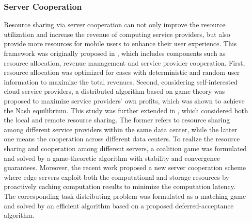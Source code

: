 \documentclass[journal]{IEEEtran}
\begin{document}
\subsubsection{\textbf{Server Cooperation}} Resource sharing via server cooperation can not only improve the resource utilization and increase the revenue of computing service providers, but also provide more resources for mobile users to enhance their user experience. This framework was originally proposed in  \cite{kaewpuang2013framework}, which includes components such as resource allocation, revenue management and service provider cooperation. First, resource allocation was optimized for cases with deterministic and random user information to maximize the total revenues. Second, considering self-interested cloud service providers, a distributed algorithm based on game theory was proposed to maximize service providers' own profits, which was shown to achieve the Nash equilibrium. This study was further extended in \cite{yu2015decentralized}, which considered both the local and remote resource sharing. The former refers to resource sharing among different service providers within the same data center, while the latter one means the cooperation across different data centers. To realize the resource sharing and cooperation among different servers, a coalition game was formulated and solved by a game-theoretic algorithm with stability and convergence guarantees. Moreover, the recent work \cite{elbamby2017proactive} proposed a new server cooperation scheme where edge servers exploit both the computational and storage resources by proactively caching computation results to minimize the computation latency. The corresponding task distributing problem was formulated as a matching game  and solved by an efficient algorithm based on a proposed deferred-acceptance algorithm.
\end{document}
